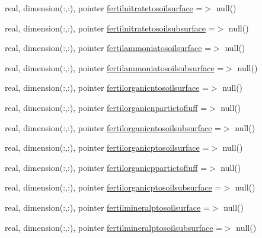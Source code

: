 \begin{DoxyCompactItemize}
\item 
real, dimension(\+:,\+:), pointer \mbox{\hyperlink{structmodulevegetation_1_1t__fluxestosoil_ae678eb8347aa26f30de2804942762b02}{fertilnitratetosoilsurface}} =$>$ null()
\item 
real, dimension(\+:,\+:), pointer \mbox{\hyperlink{structmodulevegetation_1_1t__fluxestosoil_a415587d439223df80092a96bd0f98917}{fertilnitratetosoilsubsurface}} =$>$ null()
\item 
real, dimension(\+:,\+:), pointer \mbox{\hyperlink{structmodulevegetation_1_1t__fluxestosoil_a4d8ed0fd8823b9e48b310a96965b6f7f}{fertilammoniatosoilsurface}} =$>$ null()
\item 
real, dimension(\+:,\+:), pointer \mbox{\hyperlink{structmodulevegetation_1_1t__fluxestosoil_af4f86fcc6b941cd0d20dd7eb1e3ae3a6}{fertilammoniatosoilsubsurface}} =$>$ null()
\item 
real, dimension(\+:,\+:), pointer \mbox{\hyperlink{structmodulevegetation_1_1t__fluxestosoil_a0a089de8cf89b4bfd0dc45aed213928a}{fertilorganicntosoilsurface}} =$>$ null()
\item 
real, dimension(\+:,\+:), pointer \mbox{\hyperlink{structmodulevegetation_1_1t__fluxestosoil_af41b4e4e4f5da0352036bf1dda53d1ea}{fertilorganicnpartictofluff}} =$>$ null()
\item 
real, dimension(\+:,\+:), pointer \mbox{\hyperlink{structmodulevegetation_1_1t__fluxestosoil_a56ec3b513104200cd4c22df650153ff2}{fertilorganicntosoilsubsurface}} =$>$ null()
\item 
real, dimension(\+:,\+:), pointer \mbox{\hyperlink{structmodulevegetation_1_1t__fluxestosoil_af5c452ac082469def07a481ff5782167}{fertilorganicptosoilsurface}} =$>$ null()
\item 
real, dimension(\+:,\+:), pointer \mbox{\hyperlink{structmodulevegetation_1_1t__fluxestosoil_a37d05521abf0687ff94aacf5d1c10668}{fertilorganicppartictofluff}} =$>$ null()
\item 
real, dimension(\+:,\+:), pointer \mbox{\hyperlink{structmodulevegetation_1_1t__fluxestosoil_afdaad963b6ccb7a289352eb381a86fd0}{fertilorganicptosoilsubsurface}} =$>$ null()
\item 
real, dimension(\+:,\+:), pointer \mbox{\hyperlink{structmodulevegetation_1_1t__fluxestosoil_a1b7c4663de97e38fdaf5867276537425}{fertilmineralptosoilsurface}} =$>$ null()
\item 
real, dimension(\+:,\+:), pointer \mbox{\hyperlink{structmodulevegetation_1_1t__fluxestosoil_a4a97cc99d046f735d1b7df509ccd3e05}{fertilmineralptosoilsubsurface}} =$>$ null()
\end{DoxyCompactItemize}


